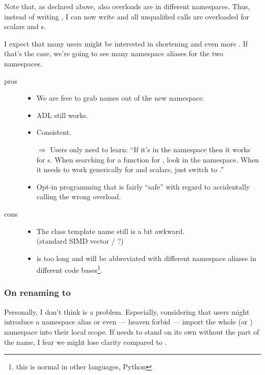 Note that, as declared above, also  overloads are in different
namespaces.
Thus, instead of writing , I can now write  and all unqualified  calls are overloaded
for scalars and s.

I expect that many users might be interested in shortening \std{} and
even more \std{}.
If that's the case, we're going to see many namespace aliases for the two
namespaces.

\begin{description}
  \item[pros]
    \begin{itemize}
      \item We are free to grab names out of the new namespace.
      \item ADL still works.
      \item Consistent.
      \item[$\Rightarrow$] Users only need to learn: “If it's in the
        \std{} namespace then it works for s.
        When searching for a function for , look in the
        \std{} namespace.
        When it needs to work generically for  and scalars, just
        switch to \std{}.”
      \item Opt-in \simdgeneric programming that is fairly “safe” with regard
        to accidentally calling the wrong overload.
    \end{itemize}

  \item[cons]
    \begin{itemize}
      \item The class template name \std{} still is a bit
        awkward.
        \\(standard SIMD vector / \std{}?)
      \item \std{} is too long and will be abbreviated with
        different namespace aliases in different code bases\footnote{this is
        normal in other languages, \eg Python}.
    \end{itemize}
\end{description}


\subsubsection{On renaming  to }
Personally, I don't think \std{} is a problem.
Especially, considering that users might introduce a namespace alias or even
--- heaven forbid --- import the whole \std{} (or
\std{}) namespace into their local scope.
If  needs to stand on its own without the  part of the
name, I fear we might lose clarity compared to .

